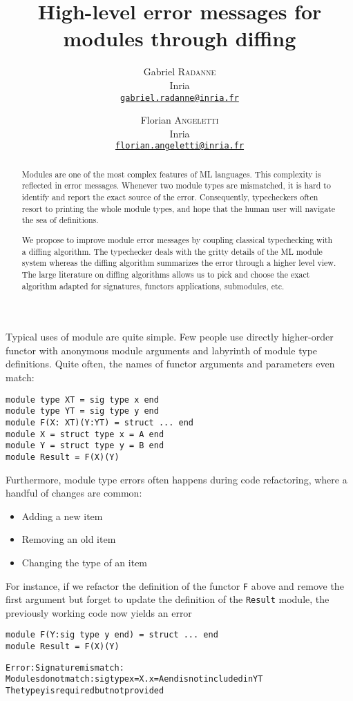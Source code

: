 \documentclass[a4paper,11pt]{scrartcl}
\title{High-level error messages for modules through diffing}
\author{
  Gabriel \textsc{Radanne}\\
  Inria\\
  \href{mailto:gabriel.radanne@inria.fr}
  {\nolinkurl{gabriel.radanne@inria.fr}}
  \and
  Florian \textsc{Angeletti}\\
  Inria\\
  \href{mailto:florian.angeletti@inria.fr}
  {\nolinkurl{florian.angeletti@inria.fr}}
}
\begin{document}
\maketitle

\begin{abstract}
Modules are one of the most complex features of ML languages. This complexity is reflected in error messages.
Whenever two module types are mismatched, it is hard to identify and report the exact source of the error.
Consequently, typecheckers often resort to printing the whole module types, and hope that the human user will navigate the sea of definitions.

We propose to improve module error messages by coupling classical typechecking with
a diffing algorithm.
The typechecker deals with the gritty details of
the ML module system whereas the diffing algorithm summarizes the error through
a higher level view.
The large literature on diffing algorithms allows us to pick and choose
the exact algorithm adapted for signatures, functors applications, submodules, etc.
\end{abstract}


Typical uses of module are quite simple. Few people use directly higher-order functor with anonymous module arguments and labyrinth of module type definitions. Quite often, the names of functor arguments and parameters even match:
\begin{verbatim}
module type XT = sig type x end
module type YT = sig type y end
module F(X: XT)(Y:YT) = struct ... end
module X = struct type x = A end
module Y = struct type y = B end
module Result = F(X)(Y)
\end{verbatim}

Furthermore, module type errors often happens during code refactoring, where a handful of changes are common:
\begin{itemize}
\item Adding a new item
\item Removing an old item
\item Changing the type of an item
\end{itemize}

For instance, if we refactor the definition of the functor \texttt{F} above and remove the first argument
but forget to update the definition of the \texttt{Result} module, the previously working code
now yields an error

\begin{verbatim}
module F(Y:sig type y end) = struct ... end
module Result = F(X)(Y)
\end{verbatim}
\begin{alltt}
Error: Signature mismatch:
       Modules do not match: sig type x = X.x = A end is not included in YT
       The type y is required but not provided
\end{alltt}
\end{document}

